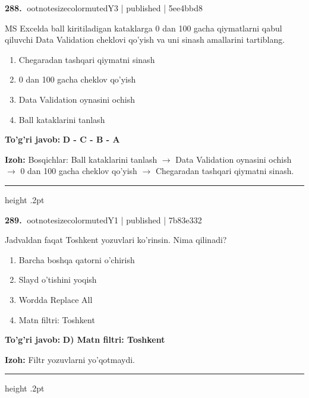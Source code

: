 \documentclass[10pt,a4paper]{article}
\begin{document}
\textbf{\color{ink}288.} {ootnotesizecolor{muted}Y3 | published | 5ee4bbd8}
\par
MS Excelda ball kiritiladigan kataklarga 0 dan 100 gacha qiymatlarni qabul qiluvchi Data Validation cheklovi qo'yish va uni sinash amallarini tartiblang.
\begin{enumerate}[label=\Alph*),leftmargin=9mm]
\item Chegaradan tashqari qiymatni sinash
\item 0 dan 100 gacha cheklov qo'yish
\item Data Validation oynasini ochish
\item Ball kataklarini tanlash
\end{enumerate}
\begin{tcolorbox}[enhanced,breakable,colback=teal!4,colframe=teal!55!black,boxrule=0.45pt,arc=1.2mm,left=2.8mm,right=2.8mm,top=2mm,bottom=2mm]
\textbf{\color{teal}To'g'ri javob:} \textbf{D - C - B - A}
\par\smallskip
\textbf{Izoh:} Bosqichlar: Ball kataklarini tanlash \ensuremath{\rightarrow} Data Validation oynasini ochish \ensuremath{\rightarrow} 0 dan 100 gacha cheklov qo'yish \ensuremath{\rightarrow} Chegaradan tashqari qiymatni sinash.
\end{tcolorbox}
\vspace{2mm}\hrule height .2pt\vspace{2mm}

\textbf{\color{ink}289.} {ootnotesizecolor{muted}Y1 | published | 7b83e332}
\par
Jadvaldan faqat Toshkent yozuvlari ko'rinsin. Nima qilinadi?
\begin{enumerate}[label=\Alph*),leftmargin=9mm]
\item Barcha boshqa qatorni o'chirish
\item Slayd o'tishini yoqish
\item Wordda Replace All
\item Matn filtri: Toshkent
\end{enumerate}
\begin{tcolorbox}[enhanced,breakable,colback=teal!4,colframe=teal!55!black,boxrule=0.45pt,arc=1.2mm,left=2.8mm,right=2.8mm,top=2mm,bottom=2mm]
\textbf{\color{teal}To'g'ri javob:} \textbf{D) Matn filtri: Toshkent}
\par\smallskip
\textbf{Izoh:} Filtr yozuvlarni yo'qotmaydi.
\end{tcolorbox}
\vspace{2mm}\hrule height .2pt\vspace{2mm}
\end{document}

